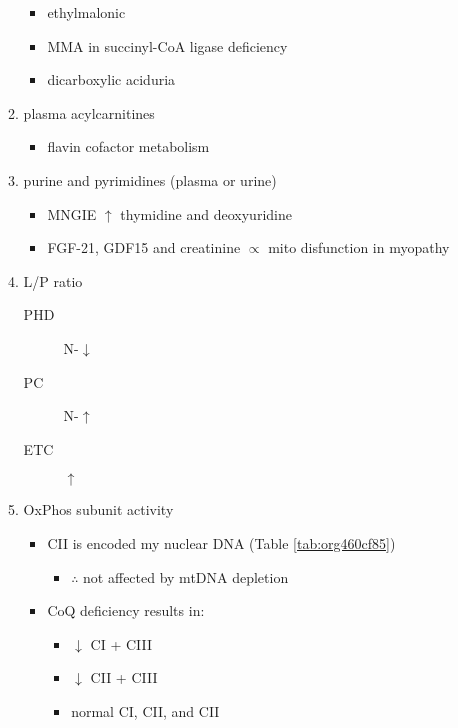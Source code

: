 \documentclass{scrartcl}
\begin{document}
\begin{enumerate}
\begin{enumerate}
\begin{itemize}
\item ethylmalonic
\item MMA in succinyl-CoA ligase deficiency
\item dicarboxylic aciduria
\end{itemize}
\item plasma acylcarnitines
\label{sec:org0a5bd60}
\begin{itemize}
\item flavin cofactor metabolism
\end{itemize}
\item purine and pyrimidines (plasma or urine)
\label{sec:org09f893b}
\begin{itemize}
\item MNGIE \(\uparrow\) thymidine and deoxyuridine
\end{itemize}
\begin{itemize}
\item FGF-21, GDF15 and creatinine \(\propto\) mito disfunction in myopathy
\end{itemize}

\item L/P ratio
\label{sec:orgc4d98ef}
\begin{description}
\item[{PHD}] N-\(\downarrow\)
\item[{PC}] N-\(\uparrow\)
\item[{ETC}] \(\uparrow\)
\end{description}
\item OxPhos subunit activity
\label{sec:orgcf2448e}
\begin{itemize}
\item CII is encoded my nuclear DNA (Table \ref{tab:org460cf85})
\begin{itemize}
\item \(\therefore\) not affected by mtDNA depletion
\end{itemize}
\item CoQ deficiency results in:
\begin{itemize}
\item \(\downarrow\) CI + CIII
\item \(\downarrow\) CII + CIII
\item normal CI, CII, and CII
\end{itemize}
\end{itemize}
\end{enumerate}


\end{enumerate}
\end{document}
